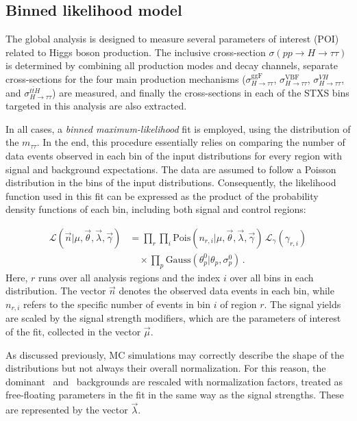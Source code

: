 \subsection{Binned likelihood model}
\label{likelihood_fit}

The global \htautau analysis is designed to measure several parameters of interest (POI) related to Higgs boson production. 
The inclusive cross-section $\sigma(pp \to H \to \tau\tau)$ is determined by combining all production modes and decay channels, 
separate cross-sections for the four main production mechanisms ($\sigma^{\mathrm{ggF}}_{H\to\tau\tau}$, $\sigma^{\mathrm{VBF}}_{H\to\tau\tau}$, $\sigma^{VH}_{H\to\tau\tau}$, and $\sigma^{t\bar{t}H}_{H\to\tau\tau}$) are measured, 
and finally the cross-sections in each of the STXS bins targeted in this analysis are also extracted.

In all cases, a \textit{binned maximum-likelihood} fit is employed, using the distribution of the $m_{\tau\tau}$.
In the end, this procedure essentially relies on comparing the number of data events observed in each bin of the input distributions for every region with signal and background expectations. The data are assumed to follow a Poisson distribution in the bins of the input distributions. Consequently, the likelihood function used in this fit can be expressed as the product of the probability density functions of each bin, including both signal and control regions:

\begin{equation}
  \begin{aligned}
  \mathcal{L}(\vec{n}|\mu, \vec{\theta}, \vec{\lambda}, \vec{\gamma}) 
    &= \prod_{r } \prod_{i } 
       \text{Pois}(n_{r,i}|\mu, \vec{\theta}, \vec{\lambda}, \vec{\gamma}) \,
       \mathcal{L}_{\gamma}(\gamma_{r,i}) \\[0.4em]
    &\quad \times \prod_{p} \text{Gauss}(\theta^{0}_{p}|\theta_{p}, \sigma^{0}_{p}) \, .
  \end{aligned}
  \end{equation}
  Here, $r$ runs over all analysis regions and the index $i$ over all bins in each distribution. 
  The vector $\vec{n}$ denotes the observed data events in each bin, while $n_{r,i}$ refers to the specific number of events in bin $i$ of region $r$. 
  The signal yields are scaled by the signal strength modifiers, which are the parameters of interest of the fit, collected in the vector $\vec{\mu}$. 
  
  As discussed previously, MC simulations may correctly describe the shape of the distributions but not always their overall normalization. 
  For this reason, the dominant \ztautau\ and \ttbar\ backgrounds are rescaled with normalization factors, treated as free-floating parameters in the fit in the same way as the signal strengths. 
  These are represented by the vector $\vec{\lambda}$. 
  
